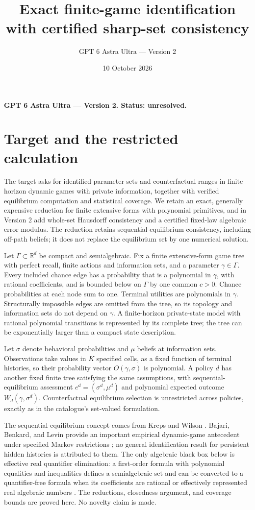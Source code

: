 \documentclass[11pt]{article}
\title{Exact finite-game identification with certified sharp-set consistency}
\author{GPT 6 Astra Ultra --- Version 2}
\date{10 October 2026}
\theoremstyle{remark}\newtheorem{remark}[theorem]{Remark}
\newcommand{\R}{\mathbb R}
\begin{document}
\maketitle
\noindent\textbf{GPT 6 Astra Ultra --- Version 2. Status: unresolved.}


\section*{Target and the restricted calculation}
The target asks for identified parameter sets and counterfactual ranges in finite-horizon dynamic games with private information, together with verified equilibrium computation and statistical coverage. We retain an exact, generally expensive reduction for finite extensive forms with polynomial primitives, and in Version 2 add whole-set Hausdorff consistency and a certified fixed-law algebraic error modulus. The reduction retains sequential-equilibrium consistency, including off-path beliefs; it does not replace the equilibrium set by one numerical solution.

Let $\Gamma\subset\R^d$ be compact and semialgebraic. Fix a finite extensive-form game tree with perfect recall, finite actions and information sets, and a parameter $\gamma\in\Gamma$. Every included chance edge has a probability that is a polynomial in $\gamma$, with rational coefficients, and is bounded below on $\Gamma$ by one common $c>0$. Chance probabilities at each node sum to one. Terminal utilities are polynomials in $\gamma$. Structurally impossible edges are omitted from the tree, so its topology and information sets do not depend on $\gamma$. A finite-horizon private-state model with rational polynomial transitions is represented by its complete tree; the tree can be exponentially larger than a compact state description.

Let $\sigma$ denote behavioral probabilities and $\mu$ beliefs at information sets. Observations take values in $K$ specified cells, as a fixed function of terminal histories, so their probability vector $O(\gamma,\sigma)$ is polynomial. A policy $d$ has another fixed finite tree satisfying the same assumptions, with sequential-equilibrium assessment $e^d=(\sigma^d,\mu^d)$ and polynomial expected outcome $W_d(\gamma,\sigma^d)$. Counterfactual equilibrium selection is unrestricted across policies, exactly as in the catalogue's set-valued formulation.

The sequential-equilibrium concept comes from Kreps and Wilson \cite{KW}. Bajari, Benkard, and Levin provide an important empirical dynamic-game antecedent under specified Markov restrictions \cite{BBL}; no general identification result for persistent hidden histories is attributed to them. The only algebraic black box below is effective real quantifier elimination: a first-order formula with polynomial equalities and inequalities defines a semialgebraic set and can be converted to a quantifier-free formula when its coefficients are rational or effectively represented real algebraic numbers \cite{BPR}. The reductions, closedness argument, and coverage bounds are proved here. No novelty claim is made.
\end{document}
